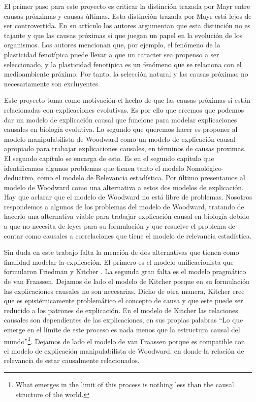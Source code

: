 El primer paso para este proyecto es criticar la distinción trazada por Mayr entre causas próxzimas y causas últimas. Esta distinción trazada por Mayr está lejos de ser controvertida. En su artículo \cite{Laland2011} los autores argumentan que esta distinción no es tajante y que las causas próximas sí que juegan un papel en la evolución de los organismos. Los autores mencionan que, por ejemplo, el fenómeno de la plasticidad fenotípica puede llevar a que un caracter sea propenso a ser seleccionado, y la plasticidad fenotípica es un fenómeno que se relaciona con el medioambiente próximo. Por tanto, la selección natural y las causas próximas no necesariamente son excluyentes.

Este proyecto toma como motivación el hecho de que las causas próximas sí están relacionadas con explicaciones evolutivas. Es por ello que creemos que podemos dar un modelo de explicación causal que funcione para modelar explicaciones causales en biología evolutiva. Lo segundo que queremos hacer es proponer al modelo manipulabilista de Woodward  \cite{Woodward2000, Woodward2003} como un modelo de explicación causal apropiado para trabajar explicaciones causales, en términos de causas proximas. El segundo capítulo se encarga de esto. Es en el segundo capítulo que identificamos algunos problemas que tienen tanto el modelo Nomológico-deductivo, como el modelo de Relevancia estadística. Por último presentamos al modelo de Woodward como una alternativa a estos dos modelos de explicación. Hay que aclarar que el modelo de Woodward no está libre de problemas. Nosotros respondemos a algunos de los problemas del modelo de Woodward, tratando de hacerlo una alternativa viable para trabajar explicación causal en biología debido a que no necesita de leyes para su formulación y que resuelve el problema de contar como causales a correlaciones que tiene el modelo de relevancia estadística.

Sin duda en este trabajo falta la mención de dos alternativas que tienen como finalidad modelar la explicación. El primero es el modelo unificacionista que formularon Friedman \citeyear{Friedman1974} y Kitcher \cite{Kitcher2002}. La segunda gran falta es el modelo pragmático de van Fraassen. Dejamos de lado el modelo de Kitcher porque en su formulación las explicaciones causales no son necesarias. Dicho de otra manera, Kitcher cree que es epistémicamente problemático el concepto de causa y que este puede ser reducido a los patrones de explicación. En el modelo de Kitcher las relaciones causales son dependientes de las explicaciones, en sus propias palabras ``Lo que emerge en el límite de este proceso es nada menos que la estructura causal del mundo''\footnote{What emerges in the limit of this process is nothing less than the causal structure of the world.}. Dejamos de lado el modelo de van Fraassen porque es compatible con el modelo de explicación manipulabilista de Woodward, en donde la relación de relevancia de estar causalmente relacionados.

